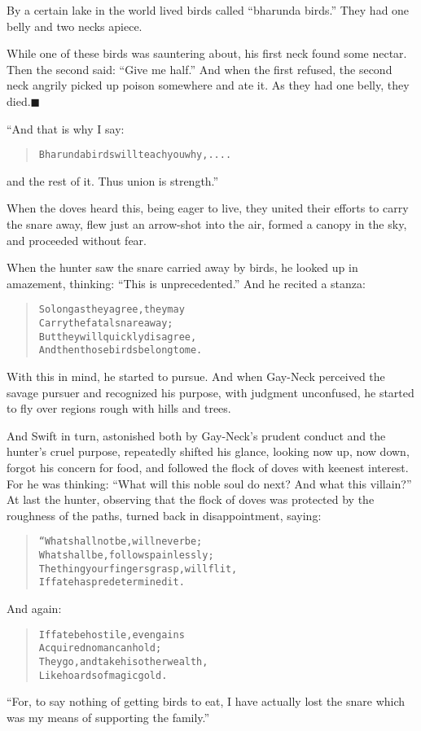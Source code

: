 \documentclass[article, twoside, 14pt]{memoir}
\newcommand{\qed}{\hfill \ensuremath{\blacksquare}}
\renewenvironment{verbatim}{%
\begin{quote}%
\vskip -10pt%
\begin{alltt}\normalfont\large}{\end{alltt}%
\end{quote}%
\vskip -10pt
} %
\begin{document}
\label{s37}

By a certain lake in the world lived birds called
``bharunda birds.'' They had one belly and two necks apiece.

While one of these birds was sauntering about, his first neck found
some nectar. Then the second said: ``Give me half.'' And when the
first refused, the second neck angrily picked up poison somewhere
and ate it. As they had one belly, they died.\hyperref[s37]{\qed}

“And that is why I say:

\begin{verbatim}
    Bharunda birds will teach you why, ....
\end{verbatim}
and the rest of it. Thus union is strength.”

When the doves heard this, being eager to live, they united their
efforts to carry the snare away, flew just an arrow-shot into
the air, formed a canopy in the sky, and proceeded without fear.

When the hunter saw the snare carried away by birds, he looked up
in amazement, thinking: ``This is unprecedented.'' And he recited a
stanza:

\begin{verbatim}
So long as they agree, they may
Carry the fatal snare away;
But they will quickly disagree,
And then those birds belong to me.
\end{verbatim}
With this in mind, he started to pursue. And when Gay-Neck
perceived the savage pursuer and recognized his purpose, with
judgment unconfused, he started to fly over regions rough with
hills and trees.

And Swift in turn, astonished both by Gay-Neck's prudent conduct
and the hunter's cruel purpose, repeatedly shifted his glance,
looking now up, now down, forgot his concern for food, and followed
the flock of doves with keenest interest. For he was thinking:
``What will this noble soul do next? And what this villain?'' At
last the hunter, observing that the flock of doves was protected by
the roughness of the paths, turned back in disappointment, saying:

\begin{verbatim}
“What shall not be, will never be;
What shall be, follows painlessly;
The thing your fingers grasp, will flit,
If fate has predetermined it.
\end{verbatim}
And again:

\begin{verbatim}
If fate be hostile, even gains
Acquired no man can hold;
They go, and take his other wealth,
Like hoards of magic gold.
\end{verbatim}
``For, to say nothing of getting birds to eat, I have actually lost the snare which was my means of supporting the family.''
\end{document}
